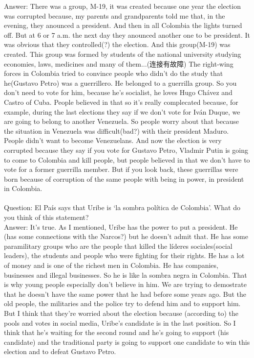 \documentclass{phyasgn}\usepackage{nag}
\begin{document}
Answer: There was a group, M-19, it was created because one year the election was corrupted because, my parents and grandparents told me that, in the evening, they anounced a president. And then in all Colombia the lights turned off. But at 6 or 7 a.m. the next day they anounced another one to be president. It was obvious that they controlled(?) the election. And this group(M-19) was created. This group was formed by students of the national university studying economies, laws, medicines and many of them...(连接有故障) The right-wing forces in Colombia tried to convince people who didn’t do the study that he(Gustavo Petro) was a guerrillero. He belonged to a guerrilla group. So you don’t need to vote for him, because he’s socialist, he loves Hugo Chávez and Castro of Cuba. People believed in that so it’s really complecated because, for example, during the last elections they say if we don’t vote for Iván Duque, we are going to belong to another Venezuela. So people worry about that because the situation in Venezuela was difficult(bad?) with their president Maduro. People didn’t want to become Venezuelans. And now the election is very corrupted because they say if you vote for Gustavo Petro, Vladmir Putin is going to come to Colombia and kill people, but people believed in that we don’t have to vote for a former guerrilla member. But if you look back, these guerrillas were born because of corruption of the same people with being in power, in president in Colombia.\\
\\
Question: El País says that Uribe is ‘la sombra política de Colombia’. What do you think of this statement?\\
Answer: It’s true. As I mentioned, Uribe has the power to put a president. He (has some connections with the Narcos?) but he doesn’t admit that. He has some paramilitary groups who are the people that killed the líderes sociales(social leaders), the students and people who were fighting for their rights. He has a lot of money and is one of the richest men in Colombia. He has companies, businesses and illegal businesses. So he is like la sombra negra in Colombia. That is why young people especially don’t believe in him. We are trying to demostrate that he doesn’t have the same power that he had before some years ago. But the old people, the militaries and the police try to defend him and to support him. But I think that they’re worried about the election because (according to) the pools and votes in social media, Uribe’s candidate is in the last position. So I think that he’s waiting for the second round and he’s going to support (his candidate) and the traditional party is going to support one candidate to win this election and to defeat Gustavo Petro.\\
\end{document}
